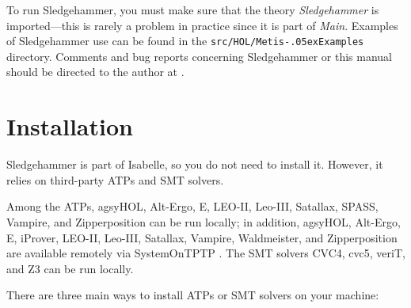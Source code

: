\documentclass[a4paper,12pt]{article}
\renewcommand\_{\hbox{\textunderscore\kern-.05ex}}
\begin{document}
To run Sledgehammer, you must make sure that the theory \textit{Sledgehammer} is
imported---this is rarely a problem in practice since it is part of
\textit{Main}. Examples of Sledgehammer use can be found in the
\texttt{src/HOL/Metis\_Examples} directory.  Comments and bug reports
concerning Sledgehammer or this manual should be directed to the author at
\authoremail.


\section{Installation}
\label{installation}

Sledgehammer is part of Isabelle, so you do not need to install it. However, it
relies on third-party ATPs and SMT solvers.

Among the ATPs, agsyHOL, Alt-Ergo, E, LEO-II, Leo-III, Satallax, SPASS, Vampire,
and Zipperposition can be run locally; in addition, agsyHOL, Alt-Ergo, E,
iProver, LEO-II, Leo-III, Satallax, Vampire, Waldmeister, and Zipperposition are
available remotely via System\-On\-TPTP \cite{sutcliffe-2000}. The SMT solvers
CVC4, cvc5, veriT, and Z3 can be run locally.

There are three main ways to install ATPs or SMT solvers on your machine:
\end{document}

